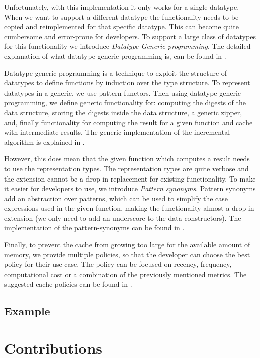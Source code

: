 Unfortunately, with this implementation it only works for a single datatype. When we want to support a different datatype the functionality needs to be copied and reimplemented for that specific datatype. This can become quite cumbersome and error-prone for developers. To support a large class of datatypes for this functionality we introduce \textit{Datatype-Generic programming}. The detailed explanation of what datatype-generic programming is, can be found in .

Datatype-generic programming is a technique to exploit the structure of datatypes to define functions by induction over the type structure. To represent datatypes in a generic, we use pattern functors. Then using datatype-generic programming, we define generic functionality for: computing the digests of the data structure, storing the digests inside the data structure, a generic zipper, and, finally functionality for computing the result for a given function and cache with intermediate results. The generic implementation of the incremental algorithm is explained in .

However, this does mean that the given function which computes a result needs to use the representation types. The representation types are quite verbose and the extension cannot be a drop-in replacement for existing functionality. To make it easier for developers to use, we introduce \textit{Pattern synonyms}\cite*{pickering2016pattern}. Pattern synonyms add an abstraction over patterns, which can be used to simplify the case expressions used in the given function, making the functionality almost a drop-in extension (we only need to add an underscore to the data constructors). The implementation of the pattern-synonyms can be found in .

Finally, to prevent the cache from growing too large for the available amount of memory, we provide multiple policies, so that the developer can choose the best policy for their use-case. The policy can be focused on recency, frequency, computational cost or a combination of the previously mentioned metrics. The suggested cache policies can be found in .

\subsection*{Example}


\section{Contributions}

